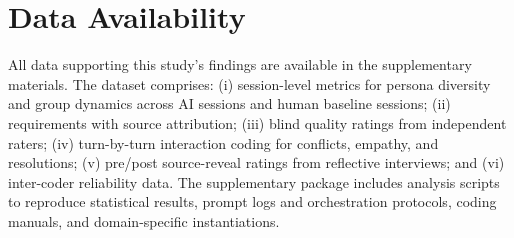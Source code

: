 \documentclass[acmsmall]{acmart}
\begin{document}
\section{Data Availability}
All data supporting this study's findings are available in the supplementary materials. The dataset comprises: (i) session-level metrics for persona diversity and group dynamics across AI sessions and human baseline sessions; (ii) requirements with source attribution; (iii) blind quality ratings from independent raters; (iv) turn-by-turn interaction coding for conflicts, empathy, and resolutions; (v) pre/post source-reveal ratings from reflective interviews; and (vi) inter-coder reliability data.  The supplementary package includes analysis scripts to reproduce statistical results, prompt logs and orchestration protocols, coding manuals, and domain-specific instantiations. 
\newpage


\end{document}
